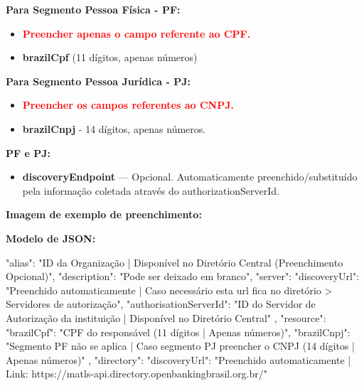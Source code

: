 \textbf{Para Segmento Pessoa Física - PF:}

\begin{itemize}
    \item \textbf{\textcolor{red}{Preencher apenas o campo referente ao CPF.}}
    \item \textbf{\textcolor{red!80}{brazilCpf}} (11 dígitos, apenas números)
\end{itemize}

\textbf{Para Segmento Pessoa Jurídica - PJ:}

\begin{itemize}
    \item \textbf{\textcolor{red}{Preencher os campos referentes ao CNPJ.}}
    \item \textbf{\textcolor{red!80}{brazilCnpj}} - 14 dígitos, apenas números.
\end{itemize}

\textbf{PF e PJ:}

\begin{itemize}
    \item \textbf{discoveryEndpoint} — Opcional. Automaticamente preenchido/substituído pela informação coletada através do authorizationServerId.
\end{itemize}

\medskip
\textbf{Imagem de exemplo de preenchimento:}

\begin{figure}[H]
    \centering
    \label{fig:portabilidade}
\end{figure}

\textbf{Modelo de JSON:}

\begin{codeblock}
{
    "alias": "ID da Organização | Disponível no Diretório Central (Preenchimento Opcional)",
    "description": "Pode ser deixado em branco",
    "server": {
        "discoveryUrl": "Preenchido automaticamente | Caso necessário esta url fica no diretório > Servidores de autorização",
        "authorisationServerId": "ID do Servidor de Autorização da instituição | Disponível no Diretório Central"
    },
    "resource": {
        "brazilCpf": "CPF do responsável (11 dígitos | Apenas números)",
        "brazilCnpj": "Segmento PF não se aplica | Caso segmento PJ preencher o CNPJ (14 dígitos | Apenas números)"
    },
    "directory": {
        "discoveryUrl": "Preenchido automaticamente | Link: https://matls-api.directory.openbankingbrasil.org.br/"
    }
}
\end{codeblock}

